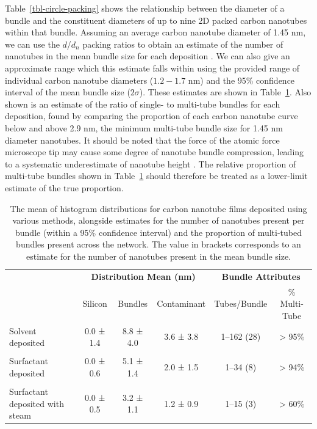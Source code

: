 \documentclass[
  a4paper,
]{scrbook}
\begin{document}
Table~\ref{tbl-circle-packing} shows the relationship between the
diameter of a bundle and the constituent diameters of up to nine 2D
packed carbon nanotubes within that bundle. Assuming an average carbon
nanotube diameter of 1.45 nm, we can use the \(d\)/\(d_n\) packing
ratios to obtain an estimate of the number of nanotubes in the mean
bundle size for each deposition \autocite{Specht2023}. We can also give
an approximate range which this estimate falls within using the provided
range of individual carbon nanotube diameters (\(1.2-1.7\) nm) and the
95\% confidence interval of the mean bundle size (\(2\sigma\)). These
estimates are shown in Table~\ref{tbl-histogram-parameters}. Also shown
is an estimate of the ratio of single- to multi-tube bundles for each
deposition, found by comparing the proportion of each carbon nanotube
curve below and above 2.9 nm, the minimum multi-tube bundle size for
1.45 nm diameter nanotubes. It should be noted that the force of the
atomic force microscope tip may cause some degree of nanotube bundle
compression, leading to a systematic underestimate of nanotube height
\autocite{Vobornik2023}. The relative proportion of multi-tube bundles
shown in Table~\ref{tbl-histogram-parameters} should therefore be
treated as a lower-limit estimate of the true proportion.

\hypertarget{tbl-histogram-parameters}{}
\begin{table}
\caption{\label{tbl-histogram-parameters}The mean of histogram distributions for carbon nanotube films deposited
using various methods, alongside estimates for the number of nanotubes
present per bundle (within a 95\% confidence interval) and the
proportion of multi-tubed bundles present across the network. The value
in brackets corresponds to an estimate for the number of nanotubes
present in the mean bundle size. }\tabularnewline

\centering
\begin{tabular}{>{\raggedright\arraybackslash}p{2cm}ccccc}
\toprule
\multicolumn{1}{c}{\textbf{ }} & \multicolumn{3}{c}{\textbf{Distribution Mean (nm)}} & \multicolumn{2}{c}{\textbf{Bundle Attributes}} \\
\cmidrule(l{3pt}r{3pt}){2-4} \cmidrule(l{3pt}r{3pt}){5-6}
 & Silicon & Bundles & Contaminant & Tubes/Bundle & \% Multi-Tube\\
\midrule
Solvent deposited & 0.0 ± 1.4 & 8.8 ± 4.0 & 3.6 ± 3.8 & 1–162 (28) & > 95\%\\
 &  &  &  &  \vphantom{1} & \\
Surfactant deposited & 0.0 ± 0.6 & 5.1 ± 1.4 & 2.0 ± 1.5 & 1–34 (8) & > 94\%\\
 &  &  &  &  & \\
Surfactant deposited with steam & 0.0 ± 0.5 & 3.2 ± 1.1 & 1.2 ± 0.9 & 1–15 (3) & > 60\%\\
\bottomrule
\end{tabular}
\end{table}
\end{document}
